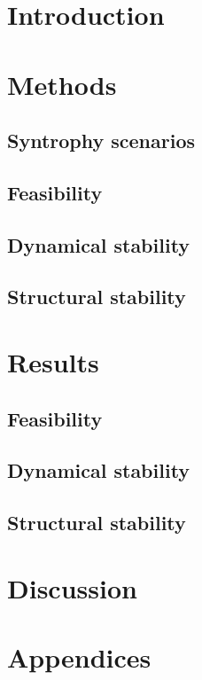 \documentclass[12pt, titlepage, twoside, openright]{report}
\begin{document}
  
  \tableofcontents
  \chapter{Introduction}
  

  \chapter{Methods}\label{chap : methods}
  \section{Syntrophy scenarios}
  
  \section{Feasibility}\label{sec : methods feasibility}
  
  \FloatBarrier
  \newpage
  \section{Dynamical stability}\label{sec : methods dynamical stability}
  
  \FloatBarrier
  \newpage
  \section{Structural stability}
  
  \FloatBarrier

  \chapter{Results}\label{chapter : results}
  
  \section{Feasibility}
  
  \FloatBarrier
  \newpage
  \section{Dynamical stability}
  
  \FloatBarrier
  \newpage
  \section{Structural stability}\label{sec : results structural stability}
  
  \FloatBarrier
  \chapter{Discussion}
  
  \FloatBarrier
  \chapter{Appendices}
  
  \printbibliography
\end{document}
